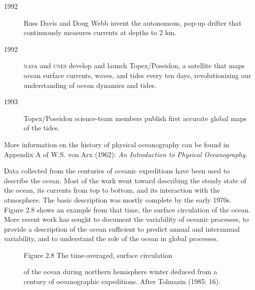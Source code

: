 \begin{description}
\item[1992] Russ Davis and Doug Webb invent the autonomous, pop-up
  drifter that continuously measures currents at depths to 2 km.
\vspace{-1.0ex} 

\item[1992] \textsc{nasa} and \textsc{cnes} develop and launch
  Topex/Poseidon, a satellite that maps ocean
  surface currents, waves, and tides every ten days, revolutionizing
  our understanding of ocean dynamics and tides.

\item[1993] Topex/Poseidon science-team members publish first accurate
  global maps of the tides.

\end{description}
\vspace{-1.0ex}
More information on the history of physical oceanography can be found
in Appendix A of W.S. von Arx (1962): \textit{An Introduction to
  Physical Oceanography}.

Data collected from the centuries of oceanic expeditions have been
used to describe the ocean. Most of the work went toward describing
the steady state of the ocean, its currents from top to bottom, and
its interaction with the atmosphere. The basic description was mostly
complete by the early 1970s. Figure 2.8 shows an example from that
time, the surface circulation of the ocean. More recent work has
sought to document the variability of oceanic processes, to provide a
description of the ocean sufficient to predict annual and interannual
variability, and to understand the role of the ocean in global
processes.

\begin{figure}[t!]
\centering
\footnotesize
Figure 2.8 The time-averaged, surface circulation \rule{0mm}{3ex}of
the ocean during northern hemisphere winter deduced from a century of
oceanographic expeditions. After Tolmazin (1985: 16).

\label{fig:Fig2-8}
\vspace{-3ex}
\end{figure}

